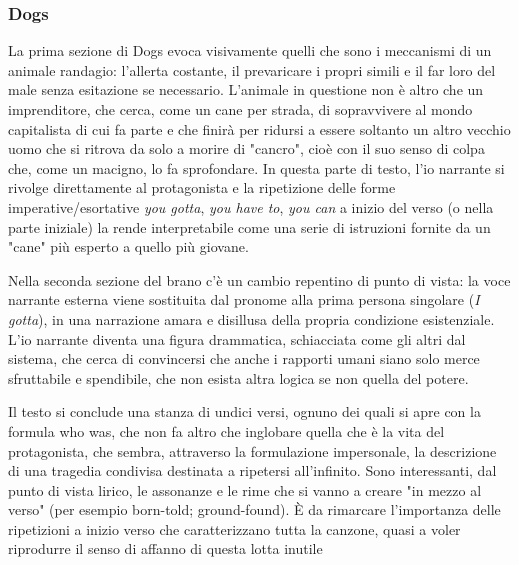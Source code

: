 \documentclass[class=book, crop=false, oneside, 12pt]{standalone}
\begin{document}
    \subsubsection{Dogs}
    La prima sezione di Dogs evoca visivamente quelli che sono i meccanismi di un animale randagio: l'allerta costante, il prevaricare i propri simili e il far loro del male senza esitazione se necessario. L'animale in questione non è altro che un imprenditore, che cerca, come un cane per strada, di sopravvivere al mondo capitalista di cui fa parte e che finirà per ridursi a essere soltanto un altro vecchio uomo che si ritrova da solo a morire di "cancro", cioè con il suo senso di colpa che, come un macigno, lo fa sprofondare. In questa parte di testo, l'io narrante si rivolge direttamente al protagonista e la ripetizione delle forme  imperative/esortative \emph{you gotta}, \emph{you have to}, \emph{you can} a inizio del verso (o nella parte iniziale) la rende interpretabile come una serie di istruzioni fornite da un "cane" più esperto a quello più giovane.

    Nella seconda sezione del brano c'è un cambio repentino di punto di vista: la voce narrante esterna viene sostituita dal pronome alla prima persona singolare (\emph{I gotta}), in una narrazione amara e disillusa della propria condizione esistenziale. L'io narrante diventa una figura drammatica, schiacciata come gli altri dal sistema, che cerca di convincersi che anche i rapporti umani siano solo merce sfruttabile e spendibile, che non esista altra logica se non quella del potere.

    Il testo si conclude una stanza di undici versi, ognuno dei quali si apre con la formula who was, che non fa altro che inglobare quella che è la vita del protagonista, che sembra, attraverso la formulazione impersonale, la descrizione di una tragedia condivisa destinata a ripetersi all'infinito. Sono interessanti, dal punto di vista lirico, le assonanze e le rime che si vanno a creare "in mezzo al verso" (per esempio born-told; ground-found). È da rimarcare l'importanza delle ripetizioni a inizio verso che caratterizzano tutta la canzone, quasi a voler riprodurre il senso di affanno di questa lotta inutile
\end{document}
